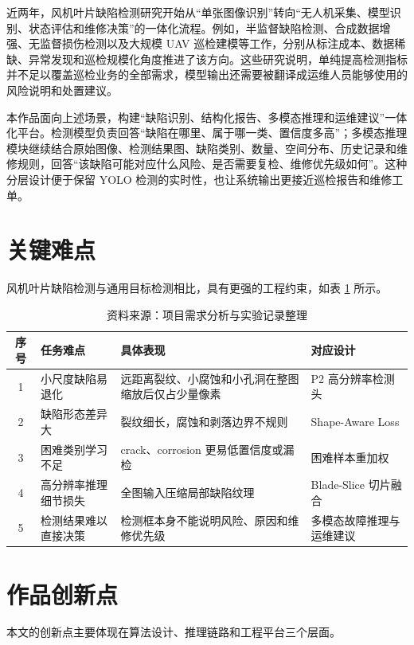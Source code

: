 \documentclass[UTF8,zihao=-4,a4paper]{ctexrep}
\newcommand{\tablesource}[1]{\vspace{-0.4em}\caption*{\footnotesize 资料来源：#1}}
\begin{document}
近两年，风机叶片缺陷检测研究开始从“单张图像识别”转向“无人机采集、模型识别、状态评估和维修决策”的一体化流程。例如，半监督缺陷检测、合成数据增强、无监督损伤检测以及大规模 UAV 巡检建模等工作，分别从标注成本、数据稀缺、异常发现和巡检规模化角度推进了该方向\cite{ye2024semi,zhang2025tia,jia2025tii,li2025mssp}。这些研究说明，单纯提高检测指标并不足以覆盖巡检业务的全部需求，模型输出还需要被翻译成运维人员能够使用的风险说明和处置建议。

本作品面向上述场景，构建“缺陷识别、结构化报告、多模态推理和运维建议”一体化平台。检测模型负责回答“缺陷在哪里、属于哪一类、置信度多高”；多模态推理模块继续结合原始图像、检测结果图、缺陷类别、数量、空间分布、历史记录和维修规则，回答“该缺陷可能对应什么风险、是否需要复检、维修优先级如何”。这种分层设计便于保留 YOLO 检测的实时性，也让系统输出更接近巡检报告和维修工单。

\section{关键难点}
风机叶片缺陷检测与通用目标检测相比，具有更强的工程约束，如表 \ref{tab:difficulty} 所示。

\begin{table}[H]
  \centering
  \caption{风机叶片缺陷检测难点与对应设计}
  \label{tab:difficulty}
  \small
  \begin{tabularx}{\textwidth}{cXXX}
    \toprule
    序号 & 任务难点 & 具体表现 & 对应设计 \\
    \midrule
    1 & 小尺度缺陷易退化 & 远距离裂纹、小腐蚀和小孔洞在整图缩放后仅占少量像素 & P2 高分辨率检测头 \\
    2 & 缺陷形态差异大 & 裂纹细长，腐蚀和剥落边界不规则 & Shape-Aware Loss \\
    3 & 困难类别学习不足 & crack、corrosion 更易低置信度或漏检 & 困难样本重加权 \\
    4 & 高分辨率推理细节损失 & 全图输入压缩局部缺陷纹理 & Blade-Slice 切片融合 \\
    5 & 检测结果难以直接决策 & 检测框本身不能说明风险、原因和维修优先级 & 多模态故障推理与运维建议 \\
    \bottomrule
  \end{tabularx}
  \tablesource{项目需求分析与实验记录整理}
\end{table}

\section{作品创新点}
本文的创新点主要体现在算法设计、推理链路和工程平台三个层面。
\end{document}
